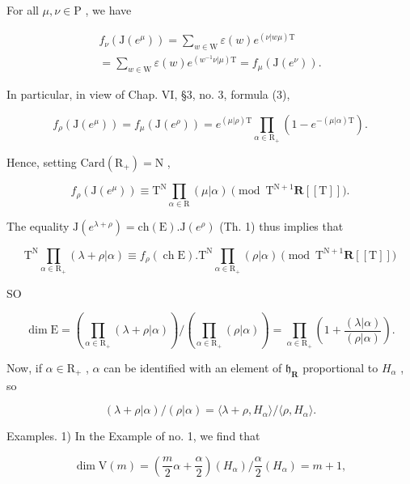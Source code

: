 For all \(\mu, \nu \in \mathrm{P}\) , we have

\[
\begin{array}{c} f _ {\nu} (\mathrm{J} (e ^ {\mu})) = \sum_ {w \in \mathrm{W}} \varepsilon (w) e ^ {(\nu | w \mu) \mathrm{T}} \\ = \sum_ {w \in \mathrm{W}} \varepsilon (w) e ^ {(w ^ {- 1} \nu | \mu) \mathrm{T}} = f _ {\mu} (\mathrm{J} (e ^ {\nu})). \end{array}
\]

In particular, in view of Chap. VI, §3, no. 3, formula (3),

\[
f _ {\rho} (\mathrm{J} (e ^ {\mu})) = f _ {\mu} (\mathrm{J} (e ^ {\rho})) = e ^ {(\mu | \rho) \mathrm{T}} \prod_ {\alpha \in \mathrm{R} _ {+}} (1 - e ^ {- (\mu | \alpha) \mathrm{T}}).
\]

Hence, setting \(\mathrm{Card}(\mathrm{R}_{+})=\mathrm{N}\) ,

\[
f _ {\rho} (\mathrm{J} (e ^ {\mu})) \equiv \mathrm{T} ^ {\mathrm{N}} \prod_ {\alpha \in \mathrm{R}} (\mu | \alpha) \pmod {\mathrm{T} ^ {\mathrm{N} + 1} \mathbf {R} [ [ \mathrm{T} ] ]}.
\]

The equality \(\mathrm{J}(e^{\lambda +\rho}) = \mathrm{ch}(\mathrm{E}).\mathrm{J}(e^{\rho})\) (Th. 1) thus implies that

\[
\mathrm{T} ^ {\mathrm{N}} \prod_ {\alpha \in \mathrm{R} _ {+}} (\lambda + \rho | \alpha) \equiv f _ {\rho} (\operatorname{ch} \mathrm{E}). \mathrm{T} ^ {\mathrm{N}} \prod_ {\alpha \in \mathrm{R} _ {+}} (\rho | \alpha) \pmod {\mathrm{T} ^ {\mathrm{N} + 1} \mathbf {R} [ [ \mathrm{T} ] ]}
\]

SO

\[
\dim \mathrm{E} = \left(\prod_ {\alpha \in \mathrm{R} _ {+}} (\lambda + \rho | \alpha)\right) / \left(\prod_ {\alpha \in \mathrm{R} _ {+}} (\rho | \alpha)\right) = \prod_ {\alpha \in \mathrm{R} _ {+}} \left(1 + \frac {(\lambda | \alpha)}{(\rho | \alpha)}\right).
\]

Now, if \(\alpha \in \mathrm{R}_{+}\) , \(\alpha\) can be identified with an element of \(\mathfrak{h}_{\mathbf{R}}\) proportional to \(H_{\alpha}\) , so

\[
(\lambda + \rho | \alpha) / (\rho | \alpha) = \langle \lambda + \rho , H _ {\alpha} \rangle / \langle \rho , H _ {\alpha} \rangle .
\]

Examples. 1) In the Example of no. 1, we find that

\[
\dim \mathrm{V} (m) = \left(\frac {m}{2} \alpha + \frac {\alpha}{2}\right) (H _ {\alpha}) / \frac {\alpha}{2} (H _ {\alpha}) = m + 1,
\]

